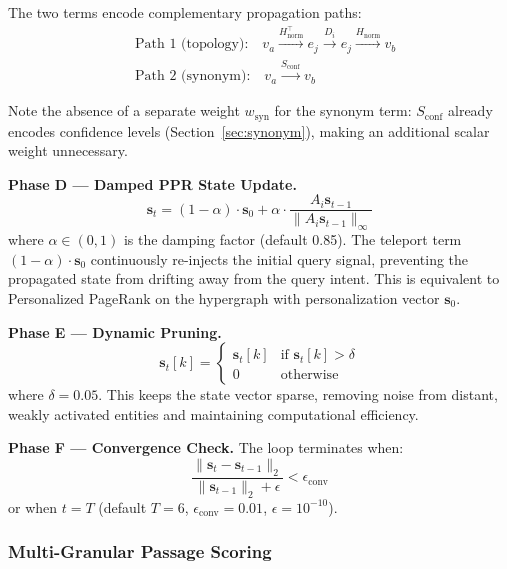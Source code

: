 \documentclass[11pt,a4paper]{article}
\begin{document}
The two terms encode complementary propagation paths:
\begin{align}
    &\text{Path 1 (topology):} \quad v_a \xrightarrow{H_{\text{norm}}^\top} e_j \xrightarrow{D_i} e_j \xrightarrow{H_{\text{norm}}} v_b \\
    &\text{Path 2 (synonym):} \quad v_a \xrightarrow{S_{\text{conf}}} v_b
\end{align}

Note the absence of a separate weight $w_{\text{syn}}$ for the synonym term: $S_{\text{conf}}$ already encodes confidence levels (Section~\ref{sec:synonym}), making an additional scalar weight unnecessary.

\textbf{Phase D --- Damped PPR State Update.}
\begin{equation}
\label{eq:ppr}
    \mathbf{s}_t = (1 - \alpha) \cdot \mathbf{s}_0 + \alpha \cdot \frac{A_i \mathbf{s}_{t-1}}{\|A_i \mathbf{s}_{t-1}\|_\infty}
\end{equation}
where $\alpha \in (0, 1)$ is the damping factor (default 0.85). The teleport term $(1 - \alpha) \cdot \mathbf{s}_0$ continuously re-injects the initial query signal, preventing the propagated state from drifting away from the query intent. This is equivalent to Personalized PageRank on the hypergraph with personalization vector $\mathbf{s}_0$.

\textbf{Phase E --- Dynamic Pruning.}
\begin{equation}
    \mathbf{s}_t[k] = \begin{cases} \mathbf{s}_t[k] & \text{if } \mathbf{s}_t[k] > \delta \\ 0 & \text{otherwise} \end{cases}
\end{equation}
where $\delta = 0.05$. This keeps the state vector sparse, removing noise from distant, weakly activated entities and maintaining computational efficiency.

\textbf{Phase F --- Convergence Check.} The loop terminates when:
\begin{equation}
    \frac{\|\mathbf{s}_t - \mathbf{s}_{t-1}\|_2}{\|\mathbf{s}_{t-1}\|_2 + \epsilon} < \epsilon_{\text{conv}}
\end{equation}
or when $t = T$ (default $T = 6$, $\epsilon_{\text{conv}} = 0.01$, $\epsilon = 10^{-10}$).

\subsubsection{Multi-Granular Passage Scoring}
\label{sec:scoring}
\end{document}
